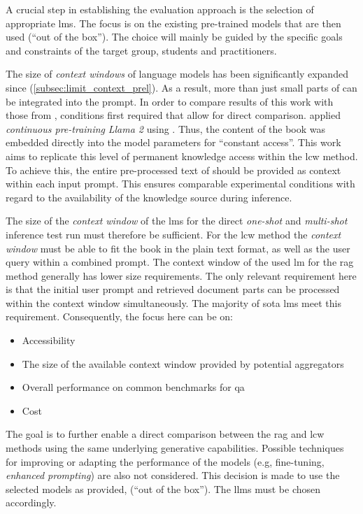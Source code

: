 A crucial step in establishing the evaluation approach is the selection of appropriate \acp{lm}.
The focus is on the existing pre-trained models that are then used (\enquote{out of the box}).
The choice will mainly be guided by the specific goals and constraints of the target group, students and practitioners.

The size of \textit{context windows} of language models has been significantly expanded since \citet{Paul_Keller} (\cref{subsec:limit_context_prel}).
As a result, more than just small parts of  can be integrated into the prompt.
In order to compare results of this work with those from \citet{Paul_Keller}, conditions first required that allow for direct comparison.
\citet{Paul_Keller} applied \textit{continuous pre-training} \textit{Llama 2} using \citet{bb2}.
Thus, the content of the book was embedded directly into the model parameters for \enquote{constant access}.
This work aims to replicate this level of permanent knowledge access within the \ac{lcw} method.
To achieve this, the entire pre-processed text of \citet{bb2} should be provided as context within each input prompt.
This ensures comparable experimental conditions with regard to the availability of the knowledge source during inference.

%
The size of the \textit{context window} of the \acp{lm} for the direct \textit{one-shot} and \textit{multi-shot} inference test run must therefore be sufficient.
For the \ac{lcw} method the \textit{context window} must be able to fit the book in the plain text format, as well as the user query within a combined prompt.
The context window of the used \ac{lm} for the \ac{rag} method generally has lower size requirements.
The only relevant requirement here is that the initial user prompt and retrieved document parts can be processed within the context window simultaneously.
The majority of \ac{sota} \acp{lm} meet this requirement.
Consequently, the focus here can be on:
\begin{itemize}
    \item Accessibility
    \item The size of the available context window provided by potential aggregators
    \item Overall performance on common benchmarks for \ac{qa}
    \item Cost 
\end{itemize}
The goal is to further enable a direct comparison between the \ac{rag} and \ac{lcw} methods using the same underlying generative capabilities.
%
Possible techniques for improving or adapting the performance of the models (e.g, fine-tuning, \textit{enhanced prompting}) are also not considered.
This decision is made to use the selected models as provided, (\enquote{out of the box}).
%
The \acp{llm} must be chosen accordingly.

